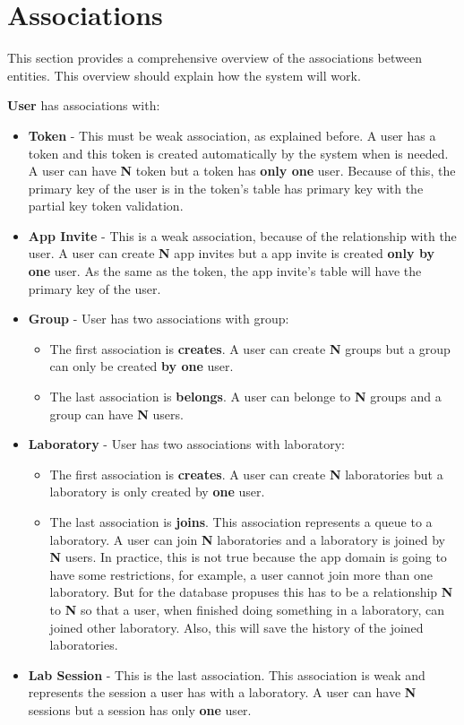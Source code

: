\documentclass[a4paper,twoside,11pt]{article}
\begin{document}
\section*{Associations}
This section provides a comprehensive overview of the associations between entities. This overview should explain how the system will work.

\textbf{User} has associations with:
\begin{itemize}
    \item \textbf{Token} - This must be weak association, as explained before. A user has a token and this token is created automatically by the system when is needed. A user can have \textbf{N} token but a token has \textbf{only one} user.
                           Because of this, the primary key of the user is in the token's table has primary key with the partial key token validation. 
    \item \textbf{App Invite} - This is a weak association, because of the relationship with the user. A user can create \textbf{N} app invites but a app invite is created \textbf{only by one} user. As the same as the token, the app invite's table will have the primary key of the user.
    \item \textbf{Group} - User has two associations with group:
    \begin{itemize}
        \item The first association is \textbf{creates}. A user can create \textbf{N} groups but a group can only be created \textbf{by one} user.
        \item The last association is \textbf{belongs}. A user can belonge to \textbf{N} groups and a group can have \textbf{N} users.
    \end{itemize}
    \item \textbf{Laboratory} - User has two associations with laboratory:
    \begin{itemize}
        \item The first association is \textbf{creates}. A user can create \textbf{N} laboratories but a laboratory is only created by \textbf{one} user. 
        \item The last association is \textbf{joins}. This association represents a queue to a laboratory. A user can join \textbf{N} laboratories and a laboratory is joined by \textbf{N} users. In practice, this is not true because the app domain is going to have some restrictions, for example, a user cannot join more than one laboratory. But for the database propuses this has to be a relationship \textbf{N} to \textbf{N} so that a user, when finished doing something in a laboratory, can joined other laboratory. Also, this will save the history of the joined laboratories. 
    \end{itemize}
    \item \textbf{Lab Session} - This is the last association. This association is weak and represents the session a user has with a laboratory. A user can have \textbf{N} sessions but a session has only \textbf{one} user.
\end{itemize}
\end{document}
